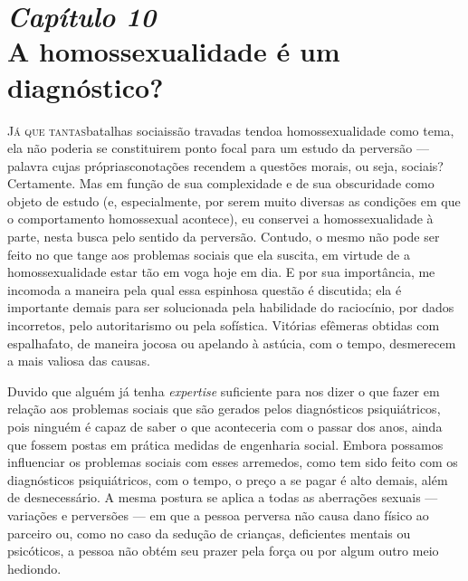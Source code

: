 \chapter[\textbf{10}\quad A homossexualidade é um diagnóstico?]{{\large\textit{Capítulo 10}}\\ A homossexualidade é um diagnóstico?}

\textsc{Já que tantas}\idxhomos[|(] batalhas sociais\idxhomosaspe[|(] são travadas tendo\idxdiag[|(] a homossexualidade
como tema, ela não poderia se constituir\idxaspec[|(] em ponto focal para um estudo
da perversão --- palavra cujas próprias\idxpervaspec[|(] conotações recendem a questões
morais, ou seja, sociais?\idxpervpecad[|(] Certamente. Mas em função de sua complexidade
e de sua obscuridade como objeto de estudo (e, especialmente, por serem
muito diversas as condições em que o comportamento homossexual
acontece), eu conservei a homossexualidade à parte, nesta busca pelo
sentido da perversão. Contudo, o mesmo não pode ser feito no que tange
aos problemas sociais que ela suscita, em virtude de a homossexualidade
estar tão em voga hoje em dia. E por sua importância, me incomoda a
maneira pela qual essa espinhosa questão é discutida; ela é importante
demais para ser solucionada pela habilidade do raciocínio, por dados
incorretos, pelo autoritarismo ou pela sofística. Vitórias efêmeras
obtidas com espalhafato, de maneira jocosa ou apelando à astúcia, com o
tempo, desmerecem a mais valiosa das causas.

Duvido que alguém já tenha \textit{expertise} suficiente para nos
dizer o que fazer em relação aos problemas sociais que são gerados pelos
diagnósticos psiquiátricos, pois ninguém é capaz de saber o que
aconteceria com o passar dos anos, ainda que fossem postas em prática
medidas de engenharia social. Embora possamos influenciar os problemas
sociais com esses arremedos, como tem sido feito com os diagnósticos
psiquiátricos, com o tempo, o preço a se pagar é alto demais, além de
desnecessário. A mesma postura se aplica a todas as aberrações sexuais
 --- variações e perversões --- em que a pessoa perversa não causa
dano físico ao parceiro ou, como no caso da sedução de crianças,\idxpedof{}
deficientes mentais ou psicóticos, a pessoa não obtém seu prazer pela
força ou por algum outro meio hediondo.

